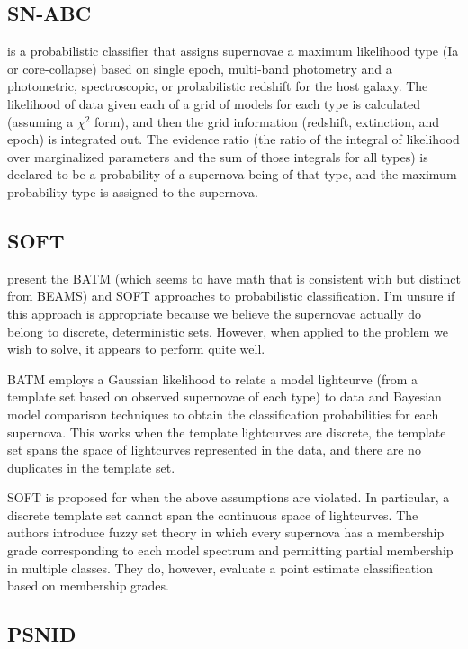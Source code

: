 \documentclass[12pt, onecolumn]{emulateapj}
\begin{document}
\subsection{SN-ABC}

\citet{Poznanski06} is a probabilistic classifier that assigns supernovae a maximum likelihood type (Ia or core-collapse) based on single epoch, multi-band photometry and a photometric, spectroscopic, or probabilistic redshift for the host galaxy.  The likelihood of data given each of a grid of models for each type is calculated (assuming a $\chi^{2}$ form), and then the grid information (redshift, extinction, and epoch) is integrated out.  The evidence ratio (the ratio of the integral of likelihood over marginalized parameters and the sum of those integrals for all types) is declared to be a probability of a supernova being of that type, and the maximum probability type is assigned to the supernova.

\subsection{SOFT}

\citet{Rodney09, Rodney10} present the BATM (which seems to have math that is consistent with but distinct from BEAMS) and SOFT approaches to probabilistic classification.  I'm unsure if this approach is appropriate because we believe the supernovae actually do belong to discrete, deterministic sets.  However, when applied to the problem we wish to solve, it appears to perform quite well.

BATM employs a Gaussian likelihood to relate a model lightcurve (from a template set based on observed supernovae of each type) to data and Bayesian model comparison techniques to obtain the classification probabilities for each supernova.  This works when the template lightcurves are discrete, the template set spans the space of lightcurves represented in the data, and there are no duplicates in the template set.  

SOFT is proposed for when the above assumptions are violated.  In particular, a discrete template set cannot span the continuous space of lightcurves.  The authors introduce fuzzy set theory in which every supernova has a membership grade corresponding to each model spectrum and permitting partial membership in multiple classes.  They do, however, evaluate a point estimate classification based on membership grades.

\subsection{PSNID}
\end{document}
